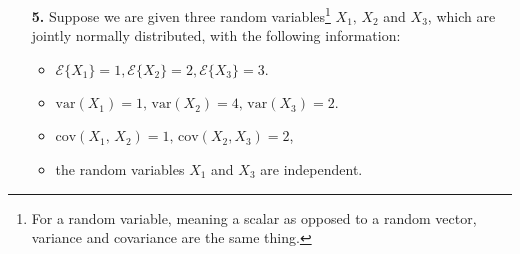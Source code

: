 \documentclass[letterpaper]{article}
\newcommand{\ExpectofGiven}[2]{{\cal E} \{ #1 | #2 \}}
\begin{document}
\begin{enumerate}

\item[{\bf 5.}] Suppose we are given three random variables\footnote{For a random variable, meaning a scalar as opposed to a random vector, variance and covariance are the same thing.} $X_{1},\,X_{2}$ and $X_3$, which are jointly normally distributed, with the following information:
    \begin{itemize}
      \item $\mathcal{E}\{X_{1}\} = 1, \mathcal{E}\{X_{2}\} = 2, \mathcal{E}\{X_{3}\} =3$.
      \item $\mathrm{var}(X_{1}) =1,\,\mathrm{var}(X_{2}) = 4,\,\mathrm{var}(X_{3}) =2.$
      \item $\mathrm{cov}(X_{1},\, X_{2}) =1, \,\mathrm{cov}(X_{2}, X_{3}) = 2$,
      \item the random variables $X_{1}$ and $X_{3}$ are independent.
    \end{itemize}


\end{enumerate}
\end{document}
